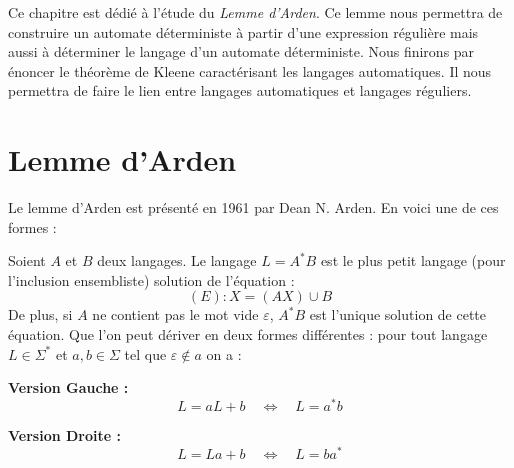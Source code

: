 

\minitoc %



Ce chapitre est dédié à l'étude du \emph{Lemme d'Arden}. Ce lemme nous permettra de 
construire un automate déterministe à partir d'une expression régulière mais aussi à déterminer 
le langage d'un automate déterministe.  Nous finirons par énoncer le théorème de Kleene 
caractérisant les langages automatiques. Il nous permettra de faire le lien entre langages automatiques 
et langages réguliers. 


\section{Lemme d'Arden}

Le lemme d'Arden est présenté en 1961 par Dean N. Arden. En voici une de ces formes : 

\begin{lemma}[Arden]
    Soient $A$ et $B$ deux langages. Le langage $L = A^*B$ est le plus petit langage (pour l'inclusion ensembliste) 
    solution de l'équation :
        \[ (E) : X = (AX) \cup B  \] 
    De plus, si $A$ ne contient pas le mot vide $\varepsilon$, $A^*B$ est l'unique solution de cette équation. 
    Que l'on peut dériver en deux formes différentes : pour tout langage $L \in \Sigma^*$ et $a,b \in  \Sigma$ tel que 
    $ \varepsilon \not \in a$ on a :

    \begin{center}
        \begin{minipage}{0.45\textwidth}
            \centering 
            \textbf{Version Gauche : }
                \[
                    \boxed{L = aL + b \quad \Longleftrightarrow \quad L = a^{*}b}
                \]
        \end{minipage}
        \hfill 
        \begin{minipage}{0.45\textwidth}
            \centering 
            \textbf{Version Droite : }
                \[
                    \boxed{L = La + b \quad \Longleftrightarrow \quad L = ba^{*}}
                \]
        \end{minipage}
    \end{center}
\end{lemma}



